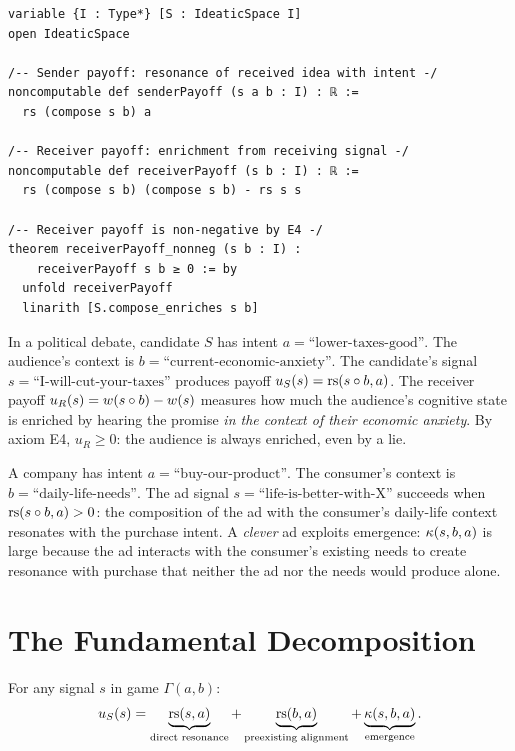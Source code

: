 \begin{lstlisting}[caption={Lean 4: Meaning game payoffs in IDT v3}]
variable {I : Type*} [S : IdeaticSpace I]
open IdeaticSpace

/-- Sender payoff: resonance of received idea with intent -/
noncomputable def senderPayoff (s a b : I) : ℝ :=
  rs (compose s b) a

/-- Receiver payoff: enrichment from receiving signal -/
noncomputable def receiverPayoff (s b : I) : ℝ :=
  rs (compose s b) (compose s b) - rs s s

/-- Receiver payoff is non-negative by E4 -/
theorem receiverPayoff_nonneg (s b : I) :
    receiverPayoff s b ≥ 0 := by
  unfold receiverPayoff
  linarith [S.compose_enriches s b]
\end{lstlisting}

\begin{example}
In a political debate, candidate $S$ has intent $a =
\text{``lower-taxes-good''}$. The audience's context is $b =
\text{``current-economic-anxiety''}$. The candidate's signal $s =
\text{``I-will-cut-your-taxes''}$ produces payoff
$u_S(s) = \mathrm{rs}(s \circ b, a)$. The receiver payoff $u_R(s) = w(s \circ b) - w(s)$ measures how much the audience's cognitive state is enriched
by hearing the promise \emph{in the context of their economic anxiety}.
By axiom E4, $u_R \geq 0$: the audience is always enriched, even by a lie.
\end{example}

\begin{example}[Advertising]
A company has intent $a = \text{``buy-our-product''}$. The consumer's context
is $b = \text{``daily-life-needs''}$. The ad signal $s =
\text{``life-is-better-with-X''}$ succeeds when $\mathrm{rs}(s \circ b, a) > 0$:
the composition of the ad with the consumer's daily-life context resonates
with the purchase intent. A \emph{clever} ad exploits emergence:
$\kappa(s, b, a)$ is large because the ad interacts with the consumer's
existing needs to create resonance with purchase that neither the ad nor
the needs would produce alone.
\end{example}


\section{The Fundamental Decomposition}

\begin{theorem}
\label{thm:sender-decomp}
For any signal $s$ in game $\Gamma(a, b)$:
\[
u_S(s) = \underbrace{\mathrm{rs}(s, a)}_{\text{direct resonance}} +
\underbrace{\mathrm{rs}(b, a)}_{\text{preexisting alignment}} +
\underbrace{\kappa(s, b, a)}_{\text{emergence}}.
\]
\end{theorem}

